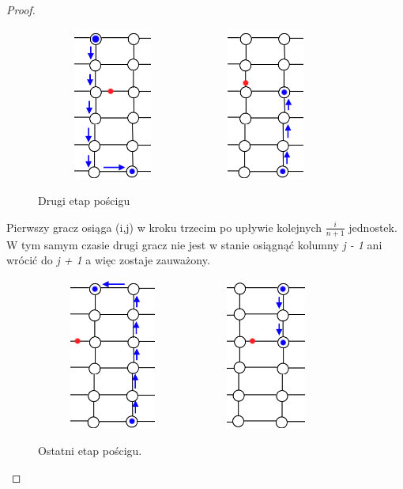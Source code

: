 \documentclass[brudnopis]{xmgr}
\begin{document}
\begin{proof}
	\begin{figure}[ht!]
	  \centering
	  \includegraphics[width=5cm,height=5cm]{rysunki/poscig_2.png}
	  \includegraphics[width=5cm,height=5cm]{rysunki/poscig_3.png}
	  \caption{Drugi etap pościgu}
	  \label{fig:drugi krok}
	\end{figure}

	\indent Pierwszy gracz osiąga (i,j) w kroku trzecim po upływie kolejnych $\frac{i}{n+1}$ jednostek. W tym samym czasie drugi gracz nie jest w stanie osiągnąć kolumny \textit{j - 1} ani wrócić do \textit{j + 1} a więc zostaje zauważony.
	\begin{figure}[ht!]
	  \centering
	  \includegraphics[width=5cm,height=5cm]{rysunki/poscig_4.png}
	  \includegraphics[width=5cm,height=5cm]{rysunki/poscig_5.png}
	  \caption{Ostatni etap pościgu.}
	  \label{fig:ostatni etap poscigu}
	\end{figure} 


\end{proof}
\end{document}
